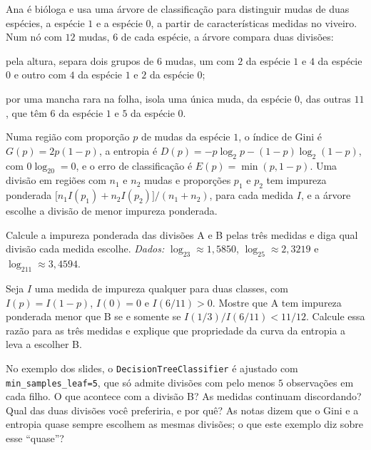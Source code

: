 Ana é bióloga e usa uma árvore de classificação para distinguir mudas de duas espécies, a
espécie $1$ e a espécie $0$, a partir de características medidas no viveiro. Num nó com $12$
mudas, $6$ de cada espécie, a árvore compara duas divisões:
\begin{description}[leftmargin=1.4cm,style=nextline]
  \item[A] pela altura, separa dois grupos de $6$ mudas, um com $2$ da espécie $1$ e $4$ da
        espécie $0$ e outro com $4$ da espécie $1$ e $2$ da espécie $0$;
  \item[B] por uma mancha rara na folha, isola uma única muda, da espécie $0$, das outras $11$,
        que têm $6$ da espécie $1$ e $5$ da espécie $0$.
\end{description}
Numa região com proporção $p$ de mudas da espécie $1$, o índice de Gini é $G(p)=2p(1-p)$, a
entropia é $D(p)=-p\log_2p-(1-p)\log_2(1-p)$, com $0\log_20=0$, e o erro de classificação é
$E(p)=\min(p,1-p)$. Uma divisão em regiões com $n_1$ e $n_2$ mudas e proporções $p_1$ e $p_2$
tem impureza ponderada $\big[n_1I(p_1)+n_2I(p_2)\big]/(n_1+n_2)$, para cada medida $I$, e a
árvore escolhe a divisão de menor impureza ponderada.
\begin{itens}
  \item {} Calcule a impureza ponderada das divisões A e B pelas três medidas e diga
        qual divisão cada medida escolhe. \emph{Dados:} $\log_23\approx1{,}5850$,
        $\log_25\approx2{,}3219$ e $\log_211\approx3{,}4594$.
  \item {} Seja $I$ uma medida de impureza qualquer para duas classes, com
        $I(p)=I(1-p)$, $I(0)=0$ e $I(6/11)>0$. Mostre que A tem impureza ponderada
        menor que B se e somente se $I(1/3)/I(6/11)<11/12$. Calcule essa razão para as
        três medidas e explique que propriedade da curva da entropia a leva a escolher B.
  \item {} No exemplo dos slides, o \texttt{DecisionTreeClassifier} é ajustado com
        \texttt{min\_samples\_leaf=5}, que só admite divisões com pelo menos $5$
        observações em cada filho. O que acontece com a divisão B? As medidas continuam
        discordando? Qual das duas divisões você preferiria, e por quê?
        As notas dizem que o Gini e a entropia quase sempre escolhem as mesmas divisões; o que
        este exemplo diz sobre esse ``quase''?
\end{itens}

